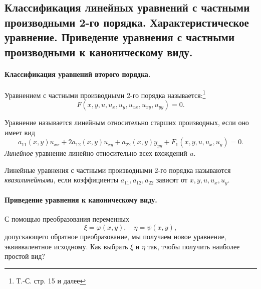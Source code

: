 \subsection{Классификация линейных уравнений с частными производными 2-го порядка. Характеристическое уравнение. Приведение уравнения с частными производными к каноническому виду.}
\label{sec:types}


\paragraph{Классификация уравнений второго порядка.}
Уравнением с частными производными 2-го порядка называется:\footnote{Т.-С. стр. 15 и далее}
\begin{equation}
	F(x, y, u, u_x, u_y, u_{xx}, u_{xy}, u_{yy}) = 0.
\end{equation}

Уравнение называется линейным относительно старших производных, если оно имеет вид
\begin{equation} \label{SOlineq}
	a_{11}(x, y) u_{xx} + 2 a_{12}(x, y) u_{xy} + a_{22}(x, y) y_{yy} + F_1(x, y, u, u_x, u_y) = 0.
\end{equation}
\textit{Линейное} уравнение линейно относительно всех вхождений $u$. 

Линейные уравнения с частными производными 2-го порядка называются \textit{квазилинейными}, если коэффициенты $a_{11}, a_{12}, a_{22}$ зависят от $x, y, u, u_x, u_y$. 

\paragraph{Приведение уравнения к каноническому виду.}
С помощью преобразования переменных
\begin{equation*}
	\xi = \varphi(x, y), \quad \eta = \psi(x, y),
\end{equation*}
допускающего обратное преобразование, мы получаем новое уравнение, эквиввалентное исходному. Как выбрать $\xi$ и $\eta$ так, тчобы получить наиболее простой вид?

